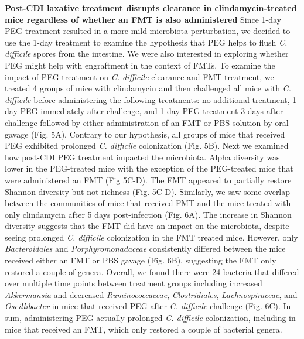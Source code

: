 \documentclass[
  11pt,
]{article}
\begin{document}
\textbf{Post-CDI laxative treatment disrupts clearance in
clindamycin-treated mice regardless of whether an FMT is also
administered} Since 1-day PEG treatment resulted in a more mild
microbiota perturbation, we decided to use the 1-day treatment to
examine the hypothesis that PEG helps to flush \emph{C. difficile}
spores from the intestine. We were also interested in exploring whether
PEG might help with engraftment in the context of FMTs. To examine the
impact of PEG treatment on \emph{C. difficile} clearance and FMT
treatment, we treated 4 groups of mice with clindamycin and then
challenged all mice with \emph{C. difficile} before administering the
following treatments: no additional treatment, 1-day PEG immediately
after challenge, and 1-day PEG treatment 3 days after challenge followed
by either administration of an FMT or PBS solution by oral gavage (Fig.
5A). Contrary to our hypothesis, all groups of mice that received PEG
exhibited prolonged \emph{C. difficile} colonization (Fig. 5B). Next we
examined how post-CDI PEG treatment impacted the microbiota. Alpha
diversity was lower in the PEG-treated mice with the exception of the
PEG-treated mice that were administered an FMT (Fig 5C-D). The FMT
appeared to partially restore Shannon diversity but not richness (Fig.
5C-D). Similarly, we saw some overlap between the communities of mice
that received FMT and the mice treated with only clindamycin after 5
days post-infection (Fig. 6A). The increase in Shannon diversity
suggests that the FMT did have an impact on the microbiota, despite
seeing prolonged \emph{C. difficile} colonization in the FMT treated
mice. However, only \emph{Bacteroidales} and \emph{Porphyromonadaceae}
consistently differed between the mice received either an FMT or PBS
gavage (Fig. 6B), suggesting the FMT only restored a couple of genera.
Overall, we found there were 24 bacteria that differed over multiple
time points between treatment groups including increased
\emph{Akkermansia} and decreased \emph{Ruminococcaceae},
\emph{Clostridiales}, \emph{Lachnospiraceae}, and \emph{Oscillibacter}
in mice that received PEG after \emph{C. difficile} challenge (Fig. 6C).
In sum, administering PEG actually prolonged \emph{C. difficile}
colonization, including in mice that received an FMT, which only
restored a couple of bacterial genera.
\end{document}
